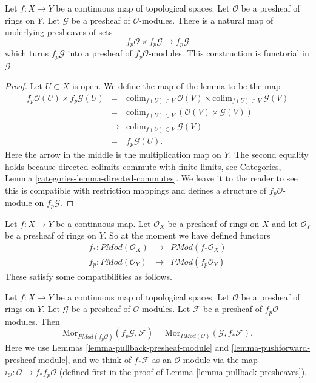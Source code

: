 \begin{lemma}
\label{lemma-pullback-presheaf-module}
Let $f : X \to Y$ be a continuous map of topological spaces.
Let $\mathcal{O}$ be a presheaf of rings on $Y$. Let
$\mathcal{G}$ be a presheaf of $\mathcal{O}$-modules.
There is a natural map of underlying presheaves of sets
$$
f_p\mathcal{O} \times f_p\mathcal{G}
\longrightarrow
f_p\mathcal{G}
$$
which turns $f_p\mathcal{G}$ into a presheaf of $f_p\mathcal{O}$-modules.
This construction is functorial in $\mathcal{G}$.
\end{lemma}

\begin{proof}
Let $U \subset X$ is open. We define the map of the lemma
to be the map
\begin{eqnarray*}
f_p\mathcal{O}(U) \times f_p\mathcal{G}(U)
& = &
\text{colim}_{f(U) \subset V}\ \mathcal{O}(V)
\times
\text{colim}_{f(U) \subset V}\ \mathcal{G}(V) \\
& = &
\text{colim}_{f(U) \subset V}\ (\mathcal{O}(V)\times \mathcal{G}(V)) \\
& \to &
\text{colim}_{f(U) \subset V}\ \mathcal{G}(V) \\
& = &
f_p\mathcal{G}(U).
\end{eqnarray*}
Here the arrow in the middle is the multiplication map on $Y$.
The second equality holds because directed colimits commute
with finite limits, see
Categories, Lemma \ref{categories-lemma-directed-commutes}.
We leave it to the reader to see this is compatible with
restriction mappings and defines a structure of
$f_p\mathcal{O}$-module on $f_p\mathcal{G}$.
\end{proof}

\noindent
Let $f : X \to Y$ be a continuous map.
Let $\mathcal{O}_X$ be a presheaf of rings on $X$ and
let $\mathcal{O}_Y$ be a presheaf of rings on $Y$.
So at the moment we have defined functors
\begin{eqnarray*}
f_* : \textit{PMod}(\mathcal{O}_X) &
\longrightarrow &
\textit{PMod}(f_*\mathcal{O}_X) \\
f_p : \textit{PMod}(\mathcal{O}_Y) &
\longrightarrow &
\textit{PMod}(f_p\mathcal{O}_Y)
\end{eqnarray*}
These satisfy some compatibilities as follows.

\begin{lemma}
\label{lemma-adjoint-push-pull-presheaves-modules}
Let $f : X \to Y$ be a continuous map of topological spaces.
Let $\mathcal{O}$ be a presheaf of rings on $Y$.
Let $\mathcal{G}$ be a presheaf of $\mathcal{O}$-modules.
Let $\mathcal{F}$ be a presheaf of $f_p\mathcal{O}$-modules.
Then
$$
\text{Mor}_{\textit{PMod}(f_p\mathcal{O})}(f_p\mathcal{G}, \mathcal{F})
=
\text{Mor}_{\textit{PMod}(\mathcal{O})}(\mathcal{G}, f_*\mathcal{F}).
$$
Here we use
Lemmas \ref{lemma-pullback-presheaf-module}
and \ref{lemma-pushforward-presheaf-module}, and we think of
$f_*\mathcal{F}$ as an $\mathcal{O}$-module via the map
$i_\mathcal{O} : \mathcal{O} \to f_*f_p\mathcal{O}$
(defined first in the proof of Lemma \ref{lemma-pullback-presheaves}).
\end{lemma}

